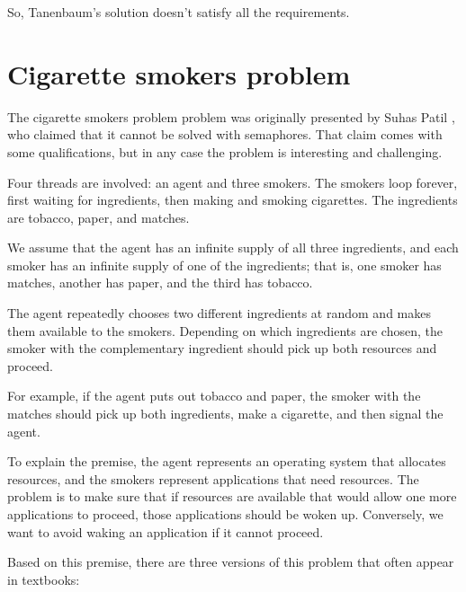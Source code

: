 \documentclass{book}
\newcommand{\clearemptydoublepage}{\newpage\cleardoublepage}
\begin{document}
So, Tanenbaum's solution doesn't satisfy all the requirements.




\clearemptydoublepage
\section {Cigarette smokers problem}

The cigarette smokers problem problem was originally presented by
Suhas Patil \cite{patil}, who claimed that it cannot be solved with
semaphores.  That claim comes with some qualifications, but in
any case the problem is interesting and challenging.

Four threads are involved: an agent and three smokers.  The smokers
loop forever, first waiting for ingredients, then making and smoking
cigarettes.  The ingredients are tobacco, paper, and matches.

We assume that the agent has an infinite supply of all three
ingredients, and each smoker has an infinite supply of one of
the ingredients; that is, one smoker has matches, another has
paper, and the third has tobacco.

The agent repeatedly chooses two different ingredients at random
and makes them available to the smokers.  Depending on which
ingredients are chosen, the smoker with the complementary ingredient
should pick up both resources and proceed.

For example, if the agent puts out tobacco and paper, the
smoker with the matches should pick up both ingredients, make
a cigarette, and then signal the agent.

To explain the premise, the agent represents an operating system that
allocates resources, and the smokers represent applications that need
resources.  The problem is to make sure that if resources are
available that would allow one more applications to proceed,
those applications should be woken up.  Conversely, we want to avoid
waking an application if it cannot proceed.



Based on this premise, there are three versions of this problem
that often appear in textbooks:
\end{document}
